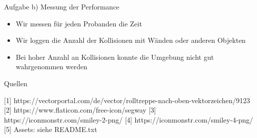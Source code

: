 \documentclass{beamer}
\begin{document}
\begin{frame}{Aufgabe b) Messung der Performance}
\begin{itemize}
\item Wir messen für jeden Probanden die Zeit
\item Wir loggen die Anzahl der Kollisionen mit Wänden oder anderen Objekten
\item Bei hoher Anzahl an Kollisionen konnte die Umgebung nicht gut wahrgenommen werden
\end{itemize}
\end{frame}


\begin{frame}{Quellen}
	\begin{thebibliography}{1}
[1]{ https://vectorportal.com/de/vector/rolltreppe-nach-oben-vektorzeichen/9123}
[2]{ https://www.flaticon.com/free-icon/segway}
[3]{ https://iconmonstr.com/smiley-2-png/}
[4]{ https://iconmonstr.com/smiley-4-png/}
[5]{ Assets: siehe README.txt}
\end{thebibliography}
\end{frame}


	
    	
    	
    	
\end{document}
